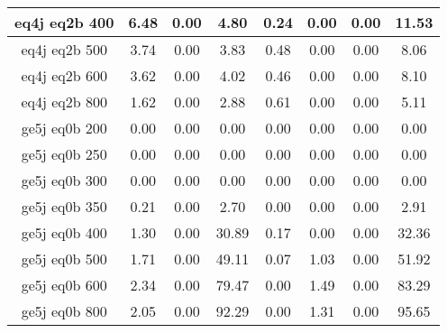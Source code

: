 \begin{longtable}{| c | c | c | c | c | c | c | c  | }
eq4j eq2b 400 & 6.48 & 0.00 & 4.80 & 0.24 & 0.00 & 0.00 & 11.53\\ \hline 
eq4j eq2b 500 & 3.74 & 0.00 & 3.83 & 0.48 & 0.00 & 0.00 & 8.06\\ \hline 
eq4j eq2b 600 & 3.62 & 0.00 & 4.02 & 0.46 & 0.00 & 0.00 & 8.10\\ \hline 
eq4j eq2b 800 & 1.62 & 0.00 & 2.88 & 0.61 & 0.00 & 0.00 & 5.11\\ \hline 
ge5j eq0b 200 & 0.00 & 0.00 & 0.00 & 0.00 & 0.00 & 0.00 & 0.00\\ \hline 
ge5j eq0b 250 & 0.00 & 0.00 & 0.00 & 0.00 & 0.00 & 0.00 & 0.00\\ \hline 
ge5j eq0b 300 & 0.00 & 0.00 & 0.00 & 0.00 & 0.00 & 0.00 & 0.00\\ \hline 
ge5j eq0b 350 & 0.21 & 0.00 & 2.70 & 0.00 & 0.00 & 0.00 & 2.91\\ \hline 
ge5j eq0b 400 & 1.30 & 0.00 & 30.89 & 0.17 & 0.00 & 0.00 & 32.36\\ \hline 
ge5j eq0b 500 & 1.71 & 0.00 & 49.11 & 0.07 & 1.03 & 0.00 & 51.92\\ \hline 
ge5j eq0b 600 & 2.34 & 0.00 & 79.47 & 0.00 & 1.49 & 0.00 & 83.29\\ \hline 
ge5j eq0b 800 & 2.05 & 0.00 & 92.29 & 0.00 & 1.31 & 0.00 & 95.65\\ \hline 
    \hline 
    \hline 
\end{longtable}
